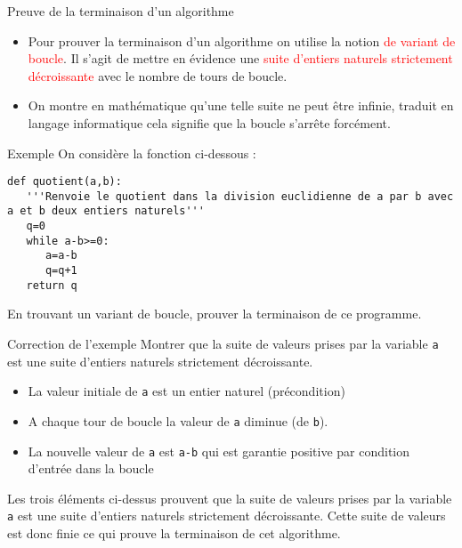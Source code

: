 \documentclass[10pt]{beamer}
\begin{document}
\begin{frame}
	\mframe{\NA}
	\begin{alertblock}{Preuve de la terminaison d'un algorithme}
		\begin{itemize}[label=\textbullet]
			\item Pour prouver la terminaison d'un algorithme on utilise la notion \textcolor{red}{de variant de boucle}. Il s'agit de mettre en évidence une \textcolor{red}{suite d'entiers naturels strictement décroissante} avec le nombre de tours de boucle. \\
			\item<2->{On montre en mathématique qu'une telle suite ne peut être infinie, traduit en langage informatique cela signifie que la boucle s'arrête forcément.}
		\end{itemize}
	\end{alertblock}
\end{frame}

\begin{frame}[fragile]
	\mframe{\NA}
	\begin{exampleblock}{Exemple}
		On considère la fonction ci-dessous :
		\begin{lstlisting}
def quotient(a,b):
   '''Renvoie le quotient dans la division euclidienne de a par b avec a et b deux entiers naturels'''
   q=0
   while a-b>=0:
      a=a-b
      q=q+1
   return q
\end{lstlisting}
		 En trouvant un variant de boucle, prouver la terminaison de ce programme.
	\end{exampleblock}
\end{frame}

\begin{frame}
	\mframe{\NA}
	\begin{exampleblock}{Correction de l'exemple}
		\textcolor{OliveGreen}{Montrer que la suite de valeurs prises par la variable \texttt{a} est une suite d'entiers naturels strictement décroissante.}
		\begin{itemize}[label=\textbullet]
			\item<2->{\textcolor{OliveGreen}{La valeur initiale de \texttt{a} est un entier naturel (précondition)}}
			\item<3->{\textcolor{OliveGreen}{A chaque tour de boucle la valeur de \texttt{a} diminue (de \texttt{b}).}}
			\item<4->{\textcolor{OliveGreen}{La nouvelle valeur de \texttt{a} est \texttt{a-b} qui est garantie positive par condition d'entrée dans la boucle}}
		\end{itemize}
		\textcolor{OliveGreen}{Les trois éléments ci-dessus prouvent que la suite de valeurs prises par la variable \texttt{a} est une suite d'entiers naturels strictement décroissante. Cette suite de valeurs est donc finie ce qui prouve la terminaison de cet algorithme.}
	\end{exampleblock}
\end{frame}
\end{document}
